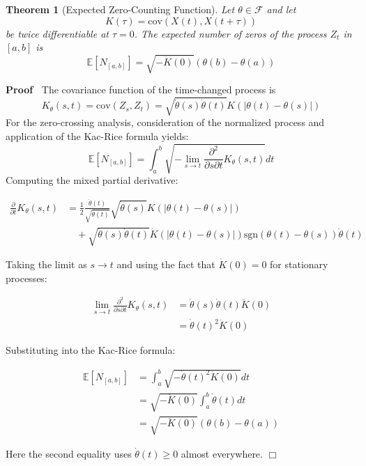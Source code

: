 \documentclass{article}
\newenvironment{proof}{\noindent\textbf{Proof\ }}{\hspace*{\fill}$\Box$\medskip}
\newtheorem{theorem}{Theorem}
\begin{document}
\begin{theorem}
  [Expected Zero-Counting Function]\label{thm:zero_count} Let $\theta \in
  \mathcal{F}$ and let
  \begin{equation}
    K (\tau) = \mathrm{cov} (X (t), X (t + \tau))
  \end{equation}
  be twice differentiable at $\tau = 0$. The expected number of zeros of the
  process $Z_t$ in $[a, b]$ is
  \begin{equation}
    \label{eq:zero_count} \mathbb{E} [N_{[a, b]}] = \sqrt{- \ddot{K} (0)} 
    (\theta (b) - \theta (a))
  \end{equation}
\end{theorem}

\begin{proof}
  The covariance function of the time-changed process is
  \begin{equation}
    \label{eq:time_changed_cov} K_{\theta} (s, t) = \mathrm{cov} (Z_s, Z_t) =
    \sqrt{\dot{\theta} (s)  \dot{\theta} (t)} K (| \theta (t) - \theta (s) |)
  \end{equation}
  For the zero-crossing analysis, consideration of the normalized process and
  application of the Kac-Rice formula yields:
  \begin{equation}
    \label{eq:kac_rice} \mathbb{E} [N_{[a, b]}] = \int_a^b \sqrt{- \lim_{s \to
    t}  \frac{\partial^2}{\partial s \partial t} K_{\theta} (s, t)} dt
  \end{equation}
  Computing the mixed partial derivative:
  
  \begin{align}
    \frac{\partial}{\partial t} K_{\theta} (s, t) & = \frac{1}{2} 
    \frac{\ddot{\theta} (t)}{\sqrt{\dot{\theta} (t)}}  \sqrt{\dot{\theta} (s)}
    K (| \theta (t) - \theta (s) |) \\
    & \quad + \sqrt{\dot{\theta} (s)  \dot{\theta} (t)}  \dot{K} (| \theta
    (t) - \theta (s) |) \mathrm{sgn} (\theta (t) - \theta (s))  \dot{\theta}
    (t) 
  \end{align}
  
  Taking the limit as $s \to t$ and using the fact that $\dot{K} (0) = 0$ for
  stationary processes:
  
  \begin{align}
    \lim_{s \to t}  \frac{\partial^2}{\partial s \partial t} K_{\theta} (s, t)
    & = \dot{\theta} (s)  \dot{\theta} (t)  \ddot{K} (0) \\
    & = \dot{\theta} (t)^2  \ddot{K} (0) 
  \end{align}
  
  Substituting into the Kac-Rice formula:
  
  \begin{align}
    \mathbb{E} [N_{[a, b]}] & = \int_a^b \sqrt{- \dot{\theta} (t)^2  \ddot{K}
    (0)} dt \\
    & = \sqrt{- \ddot{K} (0)}  \int_a^b \dot{\theta} (t) dt \\
    & = \sqrt{- \ddot{K} (0)}  (\theta (b) - \theta (a)) 
  \end{align}
  
  Here the second equality uses $\dot{\theta} (t) \geq 0$ almost everywhere.
\end{proof}
\end{document}
